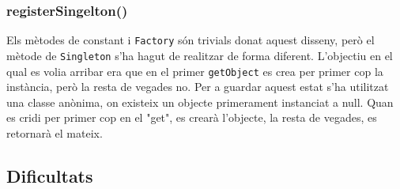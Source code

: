 \subsubsection{registerSingelton()}
Els mètodes de constant i  \texttt{Factory} són trivials donat aquest disseny, però el mètode de \texttt{Singleton} s'ha
hagut de realitzar de forma diferent. L'objectiu en el qual es volia arribar era que en el primer \texttt{getObject} es
crea per primer cop la instància, però la resta de vegades no. Per a guardar aquest estat s'ha utilitzat una classe anònima,
on existeix un objecte primerament instanciat a null. Quan es cridi per primer cop en el "get", es crearà l'objecte, la resta
de vegades, es retornarà el mateix.
\subsection{Dificultats}


